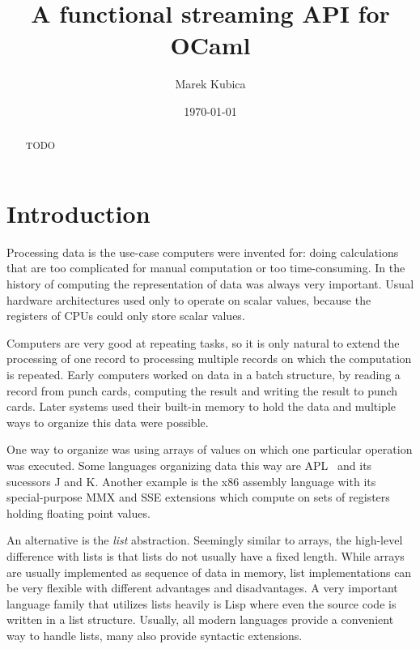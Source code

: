 \documentclass[parskip=half]{scrreprt}
\author{Marek Kubica}
\title{A functional streaming API for OCaml}
\date{\today}
\begin{document}




{}
\begin{abstract}
	\subsubsection*{\abstractname}
	TODO
\end{abstract}

\tableofcontents

\chapter{Introduction}
\label{sec:intro}

Processing data is the use-case computers were invented for: doing calculations
that are too complicated for manual computation or too time-consuming.  In the
history of computing the representation of data was always very important.
Usual hardware architectures used only to operate on scalar values, because the
registers of CPUs could only store scalar values.

Computers are very good at repeating tasks, so it is only natural to extend the
processing of one record to processing multiple records on which the
computation is repeated. Early computers worked on data in a batch structure,
by reading a record from punch cards, computing the result and writing the
result to punch cards. Later systems used their built-in memory to hold the
data and multiple ways to organize this data were possible.

One way to organize was using arrays of values on which one particular
operation was executed. Some languages organizing data this way are
APL~\cite{biancuzzi2009masterminds} and its sucessors J and K.  Another example
is the x86 assembly language with its special-purpose MMX and SSE extensions
which compute on sets of registers holding floating point values.

An alternative is the \emph{list} abstraction. Seemingly similar to arrays, the
high-level difference with lists is that lists do not usually have a fixed
length. While arrays are usually implemented as sequence of data in memory,
list implementations can be very flexible with different advantages and
disadvantages. A very important language family that utilizes lists heavily is
Lisp where even the source code is written in a list structure. Usually, all
modern languages provide a convenient way to handle lists, many also provide
syntactic extensions.
\end{document}
